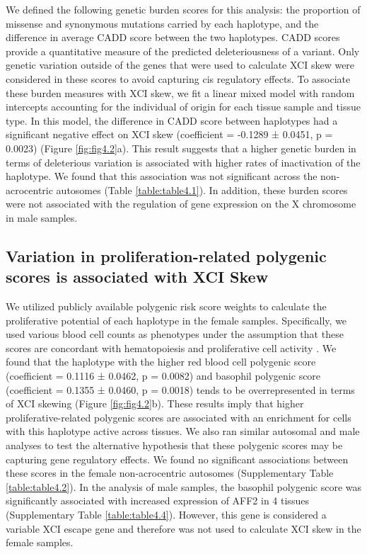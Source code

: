 We defined the following genetic burden scores for this analysis: the proportion of missense and synonymous mutations carried by each haplotype, and the difference in average CADD score \cite{Rentzsch2019-pk} between the two haplotypes. CADD scores provide a quantitative measure of the predicted deleteriousness of a variant. Only genetic variation outside of the genes that were used to calculate XCI skew were considered in these scores to avoid capturing cis regulatory effects. To associate these burden measures with XCI skew, we fit a linear mixed model with random intercepts accounting for the individual of origin for each tissue sample and tissue type. In this model, the difference in CADD score between haplotypes had a significant negative effect on XCI skew (coefficient = -0.1289 ± 0.0451, p = 0.0023) (Figure \ref{fig:fig4.2}a). This result suggests that a higher genetic burden in terms of deleterious variation is associated with higher rates of inactivation of the haplotype. We found that this association was not significant across the non-acrocentric autosomes (Table \ref{table:table4.1}). In addition, these burden scores were not associated with the regulation of gene expression on the X chromosome in male samples. 




\subsection{Variation in proliferation-related polygenic scores is associated with XCI Skew}

We utilized publicly available polygenic risk score weights to calculate the proliferative potential of each haplotype in the female samples. Specifically, we used various blood cell counts as phenotypes under the assumption that these scores are concordant with hematopoiesis and proliferative cell activity \cite{Loh2020-mb}. We found that the haplotype with the higher red blood cell polygenic score (coefficient = 0.1116 ± 0.0462, p = 0.0082) and basophil polygenic score (coefficient = 0.1355 ± 0.0460, p = 0.0018) tends to be overrepresented in terms of XCI skewing (Figure \ref{fig:fig4.2}b). These results imply that higher proliferative-related polygenic scores are associated with an enrichment for cells with this haplotype active across tissues. We also ran similar autosomal and male analyses to test the alternative hypothesis that these polygenic scores may be capturing gene regulatory effects. We found no significant associations between these scores in the female non-acrocentric autosomes (Supplementary Table \ref{table:table4.2}). In the analysis of male samples, the basophil polygenic score was significantly associated with increased expression of AFF2 in 4 tissues (Supplementary Table \ref{table:table4.4}). However, this gene is considered a variable XCI escape gene and therefore was not used to calculate XCI skew in the female samples.

